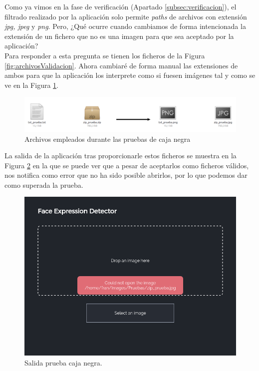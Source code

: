 \documentclass[a4paper,11pt]{book}
\begin{document}
Como ya vimos en la fase de verificación (Apartado \ref{subsec:verificacion}), el filtrado realizado por la aplicación solo permite \textit{paths} de archivos con extensión \textit{jpg, jpeg} y \textit{png}. Pero, ¿Qué ocurre cuando cambiamos de forma intencionada la extensión de un fichero que no es una imagen para que sea aceptado por la aplicación?\\
Para responder a esta pregunta se tienen los ficheros de la Figura \ref{fig:archivosValidacion}. Ahora cambiaré de forma manual las extensiones de ambos para que la aplicación los interprete como si fuesen imágenes tal y como se ve en la Figura \ref{fig:archivosValidacion01}.

\begin{figure}[!h]
	\centering
	\includegraphics[width=0.9\linewidth]{imagenes/archivosValidacion01}
	\caption[Archivos de validacion]{Archivos empleados durante las pruebas de caja negra}
	\label{fig:archivosValidacion01}
\end{figure}

La salida de la aplicación tras proporcionarle estos ficheros se muestra en la Figura \ref{fig:validation02} en la que se puede ver que a pesar de aceptarlos como ficheros válidos, nos notifica como error que no ha sido posible abrirlos, por lo que podemos dar como superada la prueba.\\

\begin{figure}[h]
\centering
\includegraphics[width=0.7\linewidth]{imagenes/validation02}
\caption[Salida prueba caja negra.]{Salida prueba caja negra.}
\label{fig:validation02}
\end{figure}
\end{document}
